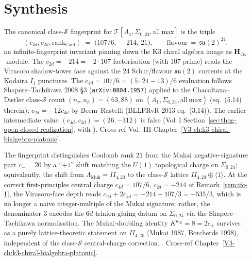 
\section{Synthesis}
\label{sec:ifc-supplement}

\begin{remark}
\label{rem:ifc-1}
The canonical class-$\mathcal S$ fingerprint for
$\mathcal T[A_1,\Sigma_{0,24}, \mathrm{all\ max}]$ is the triple
\[
 (c_{4d}, c_{2d}, \mathrm{rank}_{\mathrm{Coul}})
 \;=\;
 \bigl(107/6,\, -214,\, 21\bigr),
 \qquad
 \mathrm{flavour}\,=\,\mathfrak{su}(2)^{24},
\]
an infinite-fingerprint invariant pinning down the K3 chiral algebra
image as $\mathbf H_{\Delta_5}$-module. The $c_{2d} = -214 = -2\cdot 107$
factorisation (with $107$ prime) reads the Virasoro shadow-tower face
against the $24$ Schur/flavour $\mathfrak{su}(2)$ currents at the
Kodaira $I_1$ punctures. The $c_{4d} = 107/6 = (5\cdot 24 - 13)/6$
evaluation follows Shapere--Tachikawa 2008 \S 3
(\texttt{arXiv:0804.1957}) applied to the Chacaltana--Distler
class-$\mathcal S$ count $(n_v, n_h) = (63, 88)$ on
$(A_1, \Sigma_{0,24}, \mathrm{all\ max})$ (eq.~(5.14) therein);
$c_{2d} = -12 c_{4d}$ by Beem--Rastelli (BLLPRvR 2013 eq.~(3.14)).
The earlier intermediate value $(c_{4d}, c_{2d}) = (26, -312)$ is
false (Vol~I Section~\ref{sec:thqg-open-closed-realization},
with \cite{Gaiotto2009,BeemRastelli2015}). Cross-ref
Vol.~III Chapter~\ref{V3-ch:k3-chiral-bialgebra-platonic}.
\end{remark}

\begin{remark}
\label{rem:ifc-2}
The fingerprint distinguishes Coulomb rank $21$ from the Mukai
negative-signature part $c_- = 20$ by a ``$+1$'' shift matching the
$U(1)$ topological charge on $\Sigma_{0,24}$; equivalently, the shift
from $\Lambda_{\mathrm{Muk}} = II_{4,20}$ to the class-$\mathcal S$
lattice $II_{4,20}\oplus\langle 1\rangle$. At the correct
first-principles central charge $c_{4d} = 107/6$, $c_{2d} = -214$
of Remark~\ref{rem:ifc-1}, the Virasoro-face depth reads
$c_{2d} + 2 c_{4d} = -214 + 107/3 = -535/3$, which is no longer a
naive integer-multiple of the Mukai signature; rather, the
denominator $3$ encodes the $6d$ trinion-gluing datum on
$\Sigma_{0,24}$ via the Shapere--Tachikawa normalisation.
The Mukai-doubling identity $K^{\kappa_{\mathrm{ch}}} = 8 = 2 c_+$
survives as a purely lattice-theoretic statement on $II_{4,20}$
(Mukai 1987, Borcherds 1998), independent of the class-$\mathcal S$
central-charge correction.
\cite{Mukai1987,Borcherds1998}. Cross-ref
Chapter~\ref{V3-ch:k3-chiral-bialgebra-platonic}.
\end{remark}

